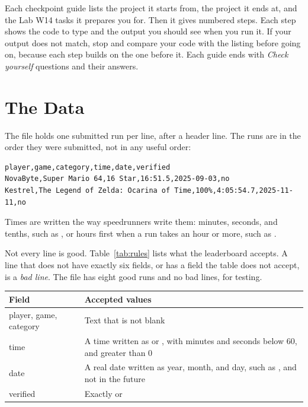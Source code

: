 \documentclass[11pt]{article}
\begin{document}
Each checkpoint guide lists the project it starts from, the project it ends at, and the Lab W14 tasks it
prepares you for. Then it gives numbered steps. Each step shows the code to type and the output
you should see when you run it. If your output does not match, stop and compare your code with the
listing before going on, because each step builds on the one before it. Each guide ends with
\emph{Check yourself} questions and their answers.

\section{The Data}

The file  holds one submitted run per line, after a header line. The runs
are in the order they were submitted, not in any useful order:

\begin{lstlisting}[style=wide]
player,game,category,time,date,verified
NovaByte,Super Mario 64,16 Star,16:51.5,2025-09-03,no
Kestrel,The Legend of Zelda: Ocarina of Time,100%,4:05:54.7,2025-11-11,no
\end{lstlisting}

Times are written the way speedrunners write them: minutes, seconds, and tenths, such as
, or hours first when a run takes an hour or more, such as .

Not every line is good. Table~\ref{tab:rules} lists what the leaderboard accepts. A line that
does not have exactly six fields, or has a field the table does not accept, is a \emph{bad line}.
The file  has eight good runs and no bad lines, for testing.

\begin{classtable}
\label{tab:rules}
\renewcommand{\arraystretch}{1.3}
\begin{tabular}{>{\ttfamily}L{1.3in} L{4.7in}}
\toprule
{}
\textrm{\textbf{Field}} & \textbf{Accepted values} \\
\midrule
player, game, category & Text that is not blank \\
time & A time written as  or , with minutes and seconds below 60, and greater than 0 \\
date & A real date written as year, month, and day, such as , and not in the future \\
verified & Exactly  or  \\
\bottomrule
\end{tabular}
\end{classtable}
\end{document}
